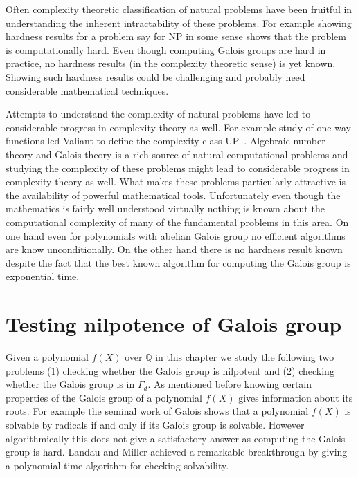 \documentclass[11pt]{madras}%
\theoremstyle{remark}
\begin{document}
Often complexity theoretic classification of natural problems have
been fruitful in understanding the inherent intractability of these
problems. For example showing hardness results for a problem say for
$\mathrm{NP}$ in some sense shows that the problem is computationally
hard. Even though computing Galois groups are hard in practice, no
hardness results (in the complexity theoretic sense) is yet known.
Showing such hardness results could be challenging and probably need
considerable mathematical techniques.

Attempts to understand the complexity of natural problems have led to
considerable progress in complexity theory as well. For example study
of one-way functions led Valiant to define the complexity class
$\mathrm{UP}$~\cite{valiant76relative}.  Algebraic number theory and
Galois theory is a rich source of natural computational problems and
studying the complexity of these problems might lead to considerable
progress in complexity theory as well.  What makes these problems
particularly attractive is the availability of powerful mathematical
tools. Unfortunately even though the mathematics is fairly well
understood virtually nothing is known about the computational
complexity of many of the fundamental problems in this area.  On one
hand even for polynomials with abelian Galois group no efficient
algorithms are know unconditionally.  On the other hand there is no
hardness result known despite the fact that the best known algorithm
for computing the Galois group is exponential time.

\chapter{Testing nilpotence of Galois group}
\label{chap-property-testing}

Given a polynomial $f(X)$ over $\mathbb{Q}$ in this chapter we study
the following two problems (1) checking whether the Galois group is
nilpotent and (2) checking whether the Galois group is in $\Gamma_d$.
As mentioned before knowing certain properties of the Galois group of
a polynomial $f(X)$ gives information about its roots. For example the
seminal work of Galois shows that a polynomial $f(X)$ is solvable by
radicals if and only if its Galois group is solvable. However
algorithmically this does not give a satisfactory answer as computing
the Galois group is hard.  Landau and Miller
\cite{landau85solvability} achieved a remarkable breakthrough by
giving a polynomial time algorithm for checking solvability.
\end{document}
